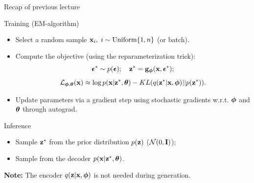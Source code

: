 \documentclass{beamer}
\begin{document}
\begin{frame}{Recap of previous lecture}
	\begin{block}{Training (EM-algorithm)}
		\begin{itemize}
			\item Select a random sample $\mathbf{x}_i, \; i \sim \text{Uniform}\{1, n\}$ (or batch).
			\item Compute the objective (using the reparameterization trick):
			\vspace{-0.3cm}
			\[
				\boldsymbol{\epsilon}^* \sim p(\boldsymbol{\epsilon}); \quad \mathbf{z}^* = \mathbf{g}_{\boldsymbol{\phi}}(\mathbf{x}, \boldsymbol{\epsilon}^*);
			\]
			\[
				\mathcal{L}_{\boldsymbol{\phi}, \boldsymbol{\theta}}(\mathbf{x}) \approx  \log p(\mathbf{x} | \mathbf{z}^*, \boldsymbol{\theta}) - KL(q(\mathbf{z}^* | \mathbf{x}, \boldsymbol{\phi}) || p(\mathbf{z}^*)).
			\]
			\item Update parameters via a gradient step using stochastic gradients w.r.t. $\boldsymbol{\phi}$ and $\boldsymbol{\theta}$ through autograd.
		\end{itemize}
	\end{block}
	\begin{block}{Inference}
		\begin{itemize}
			\item Sample $\mathbf{z}^*$ from the prior distribution $p(\mathbf{z})$ ($\mathcal{N}(0, \mathbf{I})$);
			\item Sample from the decoder $p(\mathbf{x} | \mathbf{z}^*, \boldsymbol{\theta})$.
		\end{itemize}
	\end{block}
	\textbf{Note:} The encoder $q(\mathbf{z} | \mathbf{x}, \boldsymbol{\phi})$ is not needed during generation.
\end{frame}
\end{document}
